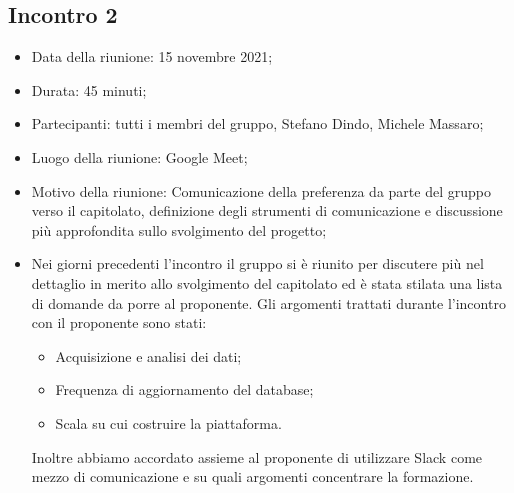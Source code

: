 \subsection{Incontro 2}
\begin{itemize}
\item Data della riunione: 15 novembre 2021;
\item Durata: 45 minuti;
\item Partecipanti: tutti i membri del gruppo,  Stefano Dindo,  Michele Massaro;
\item Luogo della riunione: Google Meet;
\item Motivo della riunione: Comunicazione della preferenza da parte del gruppo verso il capitolato, definizione degli strumenti di comunicazione e discussione più approfondita sullo svolgimento del progetto;
\item Nei giorni precedenti l’incontro il gruppo si è riunito per discutere più nel dettaglio in merito allo svolgimento del capitolato ed è stata stilata una lista di domande da porre al proponente.  Gli argomenti trattati durante l’incontro con il proponente sono stati:
	\begin{itemize}
		\item Acquisizione e analisi dei dati;
		\item Frequenza di aggiornamento del database;
		\item Scala su cui costruire la piattaforma.
	\end{itemize}
	Inoltre abbiamo accordato assieme al proponente di utilizzare Slack come mezzo di comunicazione e su quali argomenti concentrare la formazione.

\end{itemize} 


